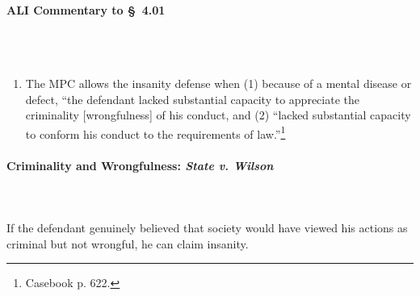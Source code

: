 \paragraph{ALI Commentary to \S\ 4.01}
~\\\\
\begin{enumerate}
    \item The MPC allows the insanity defense when (1) because of a mental 
    disease or defect, ``the defendant lacked substantial capacity to 
    appreciate the criminality [wrongfulness] of his conduct, and (2) ``lacked 
    substantial capacity to conform his conduct to the requirements of 
    law.''\footnote{Casebook p. 622.}
\end{enumerate}

\paragraph{Criminality and Wrongfulness: \emph{State v. Wilson}}
~\\\\
If the defendant genuinely believed that society would have viewed his actions 
as criminal but not wrongful, he can claim insanity.

